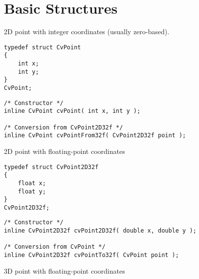 \section{Basic Structures}


\ifCPy
\label{CvPoint}
2D point with integer coordinates (usually zero-based).

\begin{lstlisting}
typedef struct CvPoint
{
    int x; 
    int y; 
}
CvPoint;
\end{lstlisting}

\begin{description}
\end{description}

\begin{lstlisting}
/* Constructor */
inline CvPoint cvPoint( int x, int y );

/* Conversion from CvPoint2D32f */
inline CvPoint cvPointFrom32f( CvPoint2D32f point );
\end{lstlisting}


\label{CvPoint2D32f}
2D point with floating-point coordinates

\begin{lstlisting}
typedef struct CvPoint2D32f
{
    float x;
    float y; 
}
CvPoint2D32f;
\end{lstlisting}

\begin{description}
\end{description}

\begin{lstlisting}
/* Constructor */
inline CvPoint2D32f cvPoint2D32f( double x, double y );

/* Conversion from CvPoint */
inline CvPoint2D32f cvPointTo32f( CvPoint point );
\end{lstlisting}


\label{CvPoint3D32f}
3D point with floating-point coordinates

